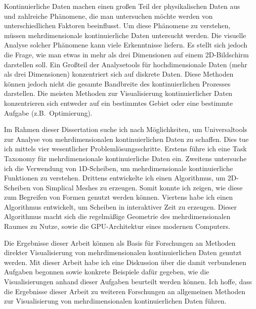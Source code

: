 
Kontinuierliche Daten machen einen gro{\ss}en Teil der physikalischen Daten aus und
zahlreiche Ph{\"a}nomene, die man untersuchen m{\"o}chte werden von unterschiedlichen
Faktoren beeinflusst. Um diese Ph{\"a}nomene zu verstehen, m{\"u}ssen mehrdimensionale
kontinuierliche Daten untersucht werden. Die visuelle Analyse solcher Ph{\"a}nomene
kann viele Erkenntnisse liefern. Es stellt sich jedoch die Frage, wie man etwas
in mehr als drei Dimensionen auf einem 2D-Bildschirm darstellen soll. Ein
Gro{\ss}teil der Analysetools f{\"u}r hochdimensionale Daten (mehr als drei
Dimensionen) konzentriert sich auf diskrete Daten. Diese Methoden k{\"o}nnen jedoch
nicht die gesamte Bandbreite des kontinuierlichen Prozesses darstellen. Die
meisten Methoden zur Visualisierung kontinuierlicher Daten konzentrieren sich
entweder auf ein bestimmtes Gebiet oder eine bestimmte Aufgabe (z.B.\
Optimierung).

Im Rahmen dieser Dissertation suche ich nach M{\"o}glichkeiten, um Universaltools
zur Analyse von mehrdimensionalen kontinuierlichen Daten zu schaffen. Dies tue
ich mittels vier wesentlicher Probleml{\"o}sungsschritte. Erstens f{\"u}hre ich eine
Task Taxonomy f{\"u}r mehrdimensionale kontinuierliche Daten ein. Zweitens
untersuche ich die Verwendung von 1D-Scheiben, um mehrdimensionale
kontinuierliche Funktionen zu verstehen. Drittens entwickelte ich einen
Algorithmus, um 2D-Scheiben von Simplical Meshes zu erzeugen. Somit konnte ich
zeigen, wie diese zum Begreifen von Formen genutzt werden k{\"o}nnen. Viertens habe
ich einen Algorithmus entwickelt, um Scheiben in interaktiver Zeit zu erzeugen.
Dieser Algorithmus macht sich die regelm{\"a}{\ss}ige Geometrie des mehrdimensionalen
Raumes zu Nutze, sowie die GPU-Architektur eines modernen Computers.

Die Ergebnisse dieser Arbeit k{\"o}nnen als Basis f{\"u}r Forschungen an Methoden
direkter Visualisierung von mehrdimensionalen kontinuierlichen Daten genutzt
werden. Mit dieser Arbeit habe ich eine Diskussion {\"u}ber die damit verbundenen
Aufgaben begonnen sowie konkrete Beispiele daf{\"u}r gegeben, wie die
Visualisierungen anhand dieser Aufgaben beurteilt werden k{\"o}nnen. Ich hoffe,
dass die Ergebnisse dieser Arbeit zu weiteren Forschungen an allgemeinen
Methoden zur Visualisierung von mehrdimensionalen kontinuierlichen Daten
f{\"u}hren.


